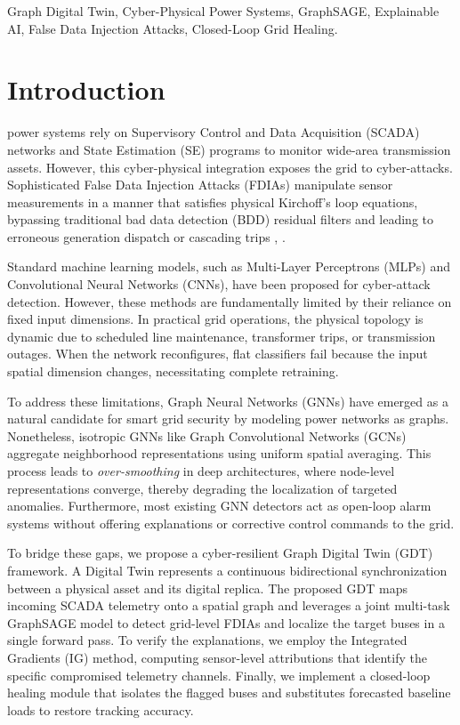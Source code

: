 \documentclass[conference]{IEEEtran}
\begin{document}
\begin{IEEEkeywords}
Graph Digital Twin, Cyber-Physical Power Systems, GraphSAGE, Explainable AI, False Data Injection Attacks, Closed-Loop Grid Healing.
\end{IEEEkeywords}

\section{Introduction}
 power systems rely on Supervisory Control and Data Acquisition (SCADA) networks and State Estimation (SE) programs to monitor wide-area transmission assets. However, this cyber-physical integration exposes the grid to cyber-attacks. Sophisticated False Data Injection Attacks (FDIAs) manipulate sensor measurements in a manner that satisfies physical Kirchoff's loop equations, bypassing traditional bad data detection (BDD) residual filters and leading to erroneous generation dispatch or cascading trips \cite{b3}, \cite{b4}.

Standard machine learning models, such as Multi-Layer Perceptrons (MLPs) and Convolutional Neural Networks (CNNs), have been proposed for cyber-attack detection. However, these methods are fundamentally limited by their reliance on fixed input dimensions. In practical grid operations, the physical topology is dynamic due to scheduled line maintenance, transformer trips, or transmission outages. When the network reconfigures, flat classifiers fail because the input spatial dimension changes, necessitating complete retraining. 

To address these limitations, Graph Neural Networks (GNNs) have emerged as a natural candidate for smart grid security by modeling power networks as graphs. Nonetheless, isotropic GNNs like Graph Convolutional Networks (GCNs) aggregate neighborhood representations using uniform spatial averaging. This process leads to \textit{over-smoothing} in deep architectures, where node-level representations converge, thereby degrading the localization of targeted anomalies. Furthermore, most existing GNN detectors act as open-loop alarm systems without offering explanations or corrective control commands to the grid.

To bridge these gaps, we propose a cyber-resilient Graph Digital Twin (GDT) framework. A Digital Twin represents a continuous bidirectional synchronization between a physical asset and its digital replica. The proposed GDT maps incoming SCADA telemetry onto a spatial graph and leverages a joint multi-task GraphSAGE model to detect grid-level FDIAs and localize the target buses in a single forward pass. To verify the explanations, we employ the Integrated Gradients (IG) method, computing sensor-level attributions that identify the specific compromised telemetry channels. Finally, we implement a closed-loop healing module that isolates the flagged buses and substitutes forecasted baseline loads to restore tracking accuracy.
\end{document}
